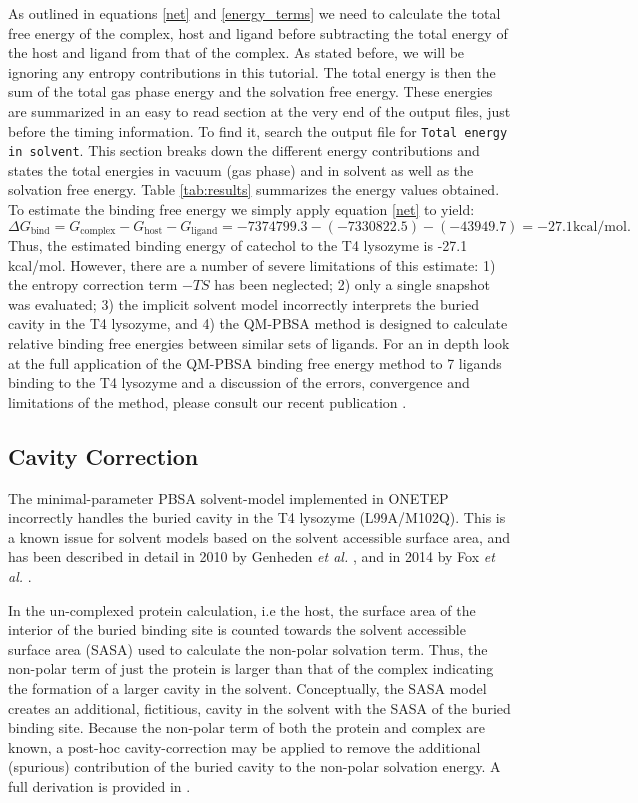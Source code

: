 \documentclass{article}
\begin{document}
As outlined in equations \ref{net} and \ref{energy_terms} we need to calculate the total free energy of the complex, host and ligand before subtracting the total energy of the host and ligand from that of the complex. As stated before, we will be ignoring any entropy contributions in this tutorial. The total energy is then the sum of the total gas phase energy and the solvation free energy. These energies are summarized in an easy to read section at the very end of the output files, just before the timing information. To find it, search the output file for \texttt{Total energy in solvent}. This section breaks down the different energy contributions and states the total energies in vacuum (gas phase) and in solvent as well as the solvation free energy. Table \ref{tab:results} summarizes the energy values obtained. To estimate the binding free energy we simply apply equation \ref{net} to yield:
\begin{equation}
    \Delta G_{\textrm{bind}}=G_{\textrm{complex}}-G_{\textrm{host}}-G_{\textrm{ligand}}= -7374799.3 -(-7330822.5) - (-43949.7) = -27.1 \textrm{kcal/mol}.
\end{equation}
 Thus, the estimated binding energy of catechol to the T4 lysozyme is -27.1 kcal/mol. However, there are a number of severe limitations of this estimate: 1) the entropy correction term $-TS$ has been neglected; 2) only a single snapshot was evaluated; 3) the implicit solvent model incorrectly interprets the buried cavity in the T4 lysozyme, and 4) the QM-PBSA method is designed to calculate relative binding free energies between similar sets of ligands. For an in depth look at the full application of the QM-PBSA binding free energy method to 7 ligands binding to the T4 lysozyme and a discussion of the errors, convergence and limitations of the method, please consult our recent publication \cite{Gundelach2021}.  
\subsection{Cavity Correction}
The minimal-parameter PBSA solvent-model implemented in ONETEP incorrectly handles the buried cavity in the T4 lysozyme (L99A/M102Q). This is a known issue for solvent models based on the solvent accessible surface area, and has been described in detail in 2010 by Genheden \textit{et al.} \cite{Genheden2010}, and in 2014 by Fox \textit{et al.} \cite{Fox2014}. 

In the un-complexed protein calculation, i.e the host, the surface area of the interior of the buried binding site is counted towards the solvent accessible surface area (SASA) used to calculate the non-polar solvation term. Thus, the non-polar term of just the protein is larger than that of the complex indicating the formation of a larger cavity in the solvent. Conceptually, the SASA model creates an additional, fictitious, cavity in the solvent with the SASA of the buried binding site. Because the non-polar term of both the protein and complex are known, a post-hoc cavity-correction may be applied to remove the additional (spurious) contribution of the buried cavity to the non-polar solvation energy. A full derivation is provided in \cite{Fox2014}.
\end{document}
